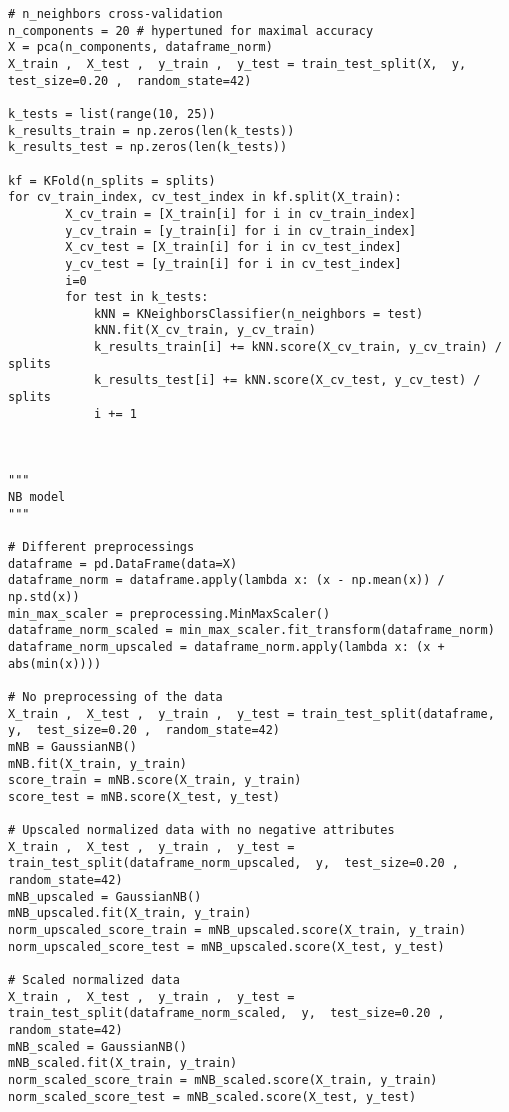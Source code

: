 \documentclass[11pt,a4paper]{article}
\begin{document}
\begin{lstlisting}
# n_neighbors cross-validation
n_components = 20 # hypertuned for maximal accuracy
X = pca(n_components, dataframe_norm)
X_train ,  X_test ,  y_train ,  y_test = train_test_split(X,  y,  test_size=0.20 ,  random_state=42)

k_tests = list(range(10, 25))
k_results_train = np.zeros(len(k_tests))
k_results_test = np.zeros(len(k_tests))

kf = KFold(n_splits = splits)
for cv_train_index, cv_test_index in kf.split(X_train):
        X_cv_train = [X_train[i] for i in cv_train_index]
        y_cv_train = [y_train[i] for i in cv_train_index]
        X_cv_test = [X_train[i] for i in cv_test_index]
        y_cv_test = [y_train[i] for i in cv_test_index]
        i=0
        for test in k_tests:
            kNN = KNeighborsClassifier(n_neighbors = test)
            kNN.fit(X_cv_train, y_cv_train) 
            k_results_train[i] += kNN.score(X_cv_train, y_cv_train) / splits
            k_results_test[i] += kNN.score(X_cv_test, y_cv_test) / splits
            i += 1



"""
NB model
"""

# Different preprocessings
dataframe = pd.DataFrame(data=X)
dataframe_norm = dataframe.apply(lambda x: (x - np.mean(x)) / np.std(x))
min_max_scaler = preprocessing.MinMaxScaler()
dataframe_norm_scaled = min_max_scaler.fit_transform(dataframe_norm)
dataframe_norm_upscaled = dataframe_norm.apply(lambda x: (x + abs(min(x))))

# No preprocessing of the data
X_train ,  X_test ,  y_train ,  y_test = train_test_split(dataframe,  y,  test_size=0.20 ,  random_state=42)
mNB = GaussianNB()
mNB.fit(X_train, y_train)
score_train = mNB.score(X_train, y_train)
score_test = mNB.score(X_test, y_test)

# Upscaled normalized data with no negative attributes
X_train ,  X_test ,  y_train ,  y_test = train_test_split(dataframe_norm_upscaled,  y,  test_size=0.20 ,  random_state=42)
mNB_upscaled = GaussianNB()
mNB_upscaled.fit(X_train, y_train)
norm_upscaled_score_train = mNB_upscaled.score(X_train, y_train)
norm_upscaled_score_test = mNB_upscaled.score(X_test, y_test)

# Scaled normalized data 
X_train ,  X_test ,  y_train ,  y_test = train_test_split(dataframe_norm_scaled,  y,  test_size=0.20 ,  random_state=42)
mNB_scaled = GaussianNB()
mNB_scaled.fit(X_train, y_train)
norm_scaled_score_train = mNB_scaled.score(X_train, y_train)
norm_scaled_score_test = mNB_scaled.score(X_test, y_test)



\end{lstlisting}
\end{document}
